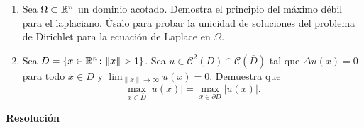\documentclass[a4paper, 12pt, extrafontsizes]{memoir}
\begin{document}
\begin{exercise}
\hfill
\begin{enumerate}
    \item Sea $\Omega \subset \mathbb R^n$ un dominio acotado. Demostra el principio del máximo débil para el laplaciano. Úsalo para probar la unicidad de soluciones del problema de Dirichlet para la ecuación de Laplace en $\Omega$.
    \item Sea $D = \{x \in \mathbb R^n \colon \| x \| > 1\}$. Sea $u \in \mathcal{C}^2(D) \cap \mathcal{C}(\overline{D})$ tal que $\Delta u(x) = 0$ para todo $x \in D$ y $\lim_{\| x \| \to \infty} u(x) = 0$. Demuestra que
    \[\max_{x \in \overline{D}} |u(x)| = \max_{x \in \partial D} |u(x)|.\]
\end{enumerate}
\end{exercise}

\newpage

\begin{center}

    \textbf{Resolución}

\end{center}
\end{document}
